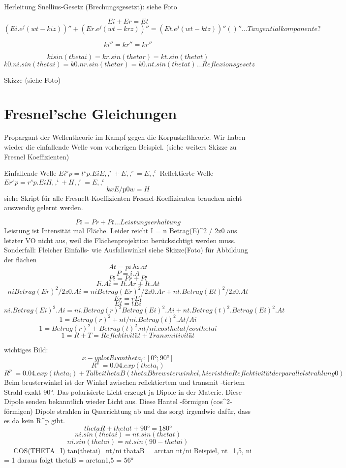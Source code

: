 \documentclass[a4paper]{article}
\begin{document}
Herleitung Snellius-Gesetz (Brechungsgesetzt): siehe Foto

\[Ei + Er = Et\]
\[(Ei.e^j(wt-kiz))'' + (Er.e^j(wt-krz))'' = (Et.e^j(wt-ktz))''           ()'' ... Tangentialkomponente ?\]

\[ki'' = kr'' = kr''\]

\[kisin(thetai)  = kr . sin(thetar) = kt.sin(thetat)\]
\[k0.ni.sin(thetai) = k0.nr.sin(thetar)=k0.nt.sin(thetat)  ... Reflexionsgesetz\]

Skizze (siehe Foto)



\section*{Fresnel'sche Gleichungen}
Propargant der Wellentheorie im Kampf gegen die Korpuskeltheorie.
Wir haben wieder die einfallende Welle vom vorherigen Beispiel. (siehe weiters Skizze zu Fresnel Koeffizienten)

Einfallende Welle $Ei^sp = t^sp.Ei           E,,^i + E,,^r =E,,^t$
Reflektierte Welle $Er^sp = r^sp.Ei          H,,^i + H,,^r = E,,^t$
\[                                            kxE/µ0w=H\]
        siehe Skript für alle Fresnelt-Koeffizienten
        Fresnel-Koeffizienten brauchen nicht auswendig gelernt werden.

        \[Pi = Pr + Pt ... Leistungserhaltung\]
Leistung ist Intensität mal Fläche. Leider reicht I = n Betrag(E)^2 / 2z0 aus
letzter VO nicht aus, weil die Flächenprojektion berücksichtigt werden muss.
Sonderfall: Fleicher Einfalls- wie Ausfallswinkel
        siehe Skizze(Foto) für Abbildung der flächen
        \[        At = pi.bz.at\]
        \[        P = i.A\]
        \[        Pi = Pr + Pt\]
        \[        Ii . Ai = It.Ar + It.At\]
        \[        niBetrag(Er)^2 / 2z0 . Ai = niBetrag(Er)^2 / 2z0 . Ar + nt.Betrag(Et)^2 / 2z0 . At\]
        \[        Er=rEi\]
        \[        Et=tEi\]
        \[        ni.Betrag(Ei)^2.Ai = ni.Betrag(r)^2Betrag(Ei)^2.Ai + nt.Betrag(t)^2. Betrag(Ei)^2.At\]
        \[        1 = Betrag(r)^2 + nt/ni . Betrag(t)^2 . At/Ai\]
        \[        1 = Betrag(r)^2 + Betrag(t)^2.nt/ni.costhetat/costhetai\]
        \[        1 =    R        +      T = Reflektivität + Transmitivität\]

wichtiges Bild:
\[    x-y plot R von theta_i: [0°; 90°]\]
\[    R^s ~=0.04 . exp(theta_i)\]
\[    R^p ~= 0.04 .exp(theta_i) + Tal bei theta B (theta B brewsterwinkel, hier ist die Reflektivität der parallelstrahlung 0)\]
    Beim brusterwinkel ist der Winkel zwischen reflektiertem und transmit
    -tiertem Strahl exakt 90°. Das polarisierte Licht erzeugt ja Dipole in der
    Materie. Diese Dipole senden bekanntlich wieder Licht aus. Diese Hantel
    -förmigen (cos^2-förmigen) Dipole strahlen in Querrichtung ab und das sorgt
    irgendwie dafür, dass es da kein R^p gibt.
    \[    thetaR+thetat+90°=180°\]
    \[    ni.sin(thetai)=nt.sin(thetat)\]
    \[    ni.sin(thetai)=nt.sin(90-thetai)\]
                    ^^^^^^^^^^^^^^^
                        COS(THETA_I)
    tan(thetai)=nt/ni
    thataB = arctan nt/ni       Beispiel, nt=1,5, ni = 1 daraus folgt thetaB = arctan1,5 = 56°
\end{document}
